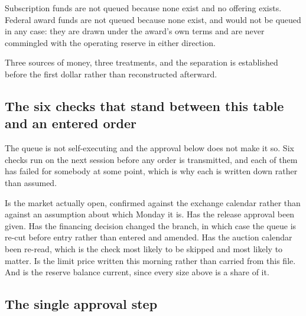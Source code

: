 Subscription funds are not queued because none exist and no offering exists.
Federal award funds are not queued because none exist, and would not be queued in
any case: they are drawn under the award's own terms and are never commingled
with the operating reserve in either direction.

Three sources of money, three treatments, and the separation is established
before the first dollar rather than reconstructed afterward.

\subsection{The six checks that stand between this table and an entered order}

The queue is not self-executing and the approval below does not make it so. Six
checks run on the next session before any order is transmitted, and each of them
has failed for somebody at some point, which is why each is written down rather
than assumed.

Is the market actually open, confirmed against the exchange calendar rather than
against an assumption about which Monday it is. Has the release approval been
given. Has the financing decision changed the branch, in which case the queue is
re-cut before entry rather than entered and amended. Has the auction calendar
been re-read, which is the check most likely to be skipped and most likely to
matter. Is the limit price written this morning rather than carried from this
file. And is the reserve balance current, since every size above is a share of it.

\subsection{The single approval step}

